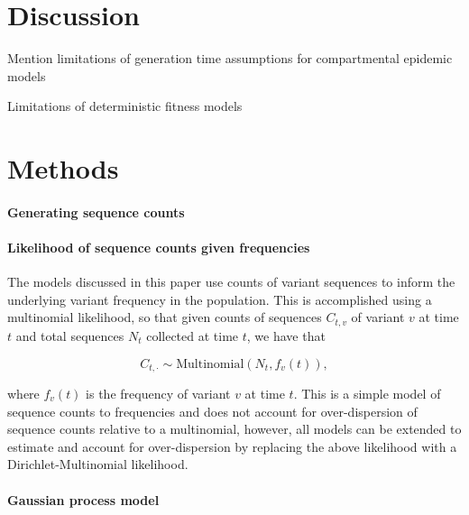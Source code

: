 \documentclass[12pt,oneside,letterpaper]{article}
\begin{document}

\section*{Discussion}

Mention limitations of generation time assumptions for compartmental epidemic models

Limitations of deterministic fitness models 


\section*{Methods}

\paragraph{Generating sequence counts}%

\cite{aksamentov2021nextclade}
\cite{Hadfield2018}

\paragraph{Likelihood of sequence counts given frequencies}

The models discussed in this paper use counts of variant sequences to inform the underlying variant frequency in the population.
This is accomplished using a multinomial likelihood, so that given counts of sequences $C_{t,v}$ of variant $v$ at time $t$ and total sequences $N_{t}$ collected at time $t$, we have that

\begin{equation*}
    C_{t, \cdot} \sim \text{Multinomial}(N_{t}, f_{v}(t)),
\end{equation*}

where $f_{v}(t)$ is the frequency of variant $v$ at time $t$.
This is a simple model of sequence counts to frequencies and does not account for over-dispersion of sequence counts relative to a multinomial, however, all models can be extended to estimate and account for over-dispersion by replacing the above likelihood with a Dirichlet-Multinomial likelihood.

\paragraph{Gaussian process model}%
\end{document}
